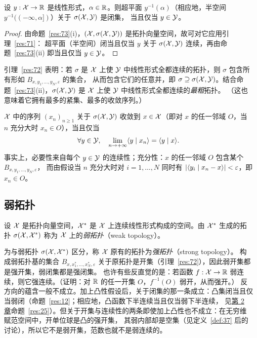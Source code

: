 \begin{corollary}
\label{res:74}
设 $y:\mathcal{X}\to\mathbb{R}$ 是线性形式，$\alpha\in\mathbb{R}$。则超平面 $y^{-1}(\alpha)$（相应地，半空间 $y^{-1}((-\infty,\alpha])$）关于 $\sigma(\mathcal{X},\mathcal{Y})$ 是闭集，
当且仅当 $y\in\mathcal{Y}$。
\end{corollary}

\begin{proof}
由命题~\ref{res:73}(i)，$(\mathcal{X},\sigma(\mathcal{X},\mathcal{Y}))$ 是拓扑向量空间，故可对它应用引理~\ref{res:71}：
超平面（半空间）闭当且仅当 $y$ 关于 $\sigma(\mathcal{X},\mathcal{Y})$ 连续，再由命题~\ref{res:73}(ii) 即当且仅当 $y\in\mathcal{Y}$。
\end{proof}

\begin{remark}[最粗拓扑]
\label{rem:26}
引理~\ref{res:72} 表明：若 $\sigma$ 是 $\mathcal{X}$ 上使 $\mathcal{Y}$ 中线性形式全都连续的拓扑，则 $\sigma$ 包含所有形如 $B_{x,y_1,\dots,y_N,\varepsilon}$ 的集合，
从而包含它们的任意并，即 $\sigma\supseteq\sigma(\mathcal{X},\mathcal{Y})$。结合命题~\ref{res:73}(ii)，$\sigma(\mathcal{X},\mathcal{Y})$ 是 $\mathcal{X}$ 上使 $\mathcal{Y}$ 中线性形式全都连续的\emph{最粗}拓扑。
（这也意味着它拥有最多的紧集、最多的收敛序列。）
\end{remark}

\begin{remark}[序列的收敛]
\label{rem:27}
$\mathcal{X}$ 中的序列 $(x_n)_{n\geqslant1}$ 关于 $\sigma(\mathcal{X},\mathcal{Y})$ 收敛到 $x\in\mathcal{X}$（即对 $x$ 的任一邻域 $O$，当 $n$ 充分大时 $x_n\in O$），当且仅当
\[
  \forall y\in\mathcal{Y},\quad\lim_{n\to+\infty}\langle y \mid x_n\rangle=\langle y \mid x\rangle.
\]
事实上，必要性来自每个 $y\in\mathcal{Y}$ 的连续性；充分性：$x$ 的任一邻域 $O$ 包含某个 $B_{x,y_1,\dots,y_N,\varepsilon}$，
而由假设当 $n$ 充分大时对 $i=1,\dots,N$ 同时有 $\lvert \langle y_i \mid x_n-x\rangle\rvert<\varepsilon$，即 $x_n\in O$。
\end{remark}

\subsection{弱拓扑}

\begin{definition}[弱拓扑]
\label{def:38}
设 $\mathcal{X}$ 是拓扑向量空间，$\mathcal{X}^{*}$ 是 $\mathcal{X}$ 上连续线性形式构成的空间。由 $\mathcal{X}^{*}$ 生成的拓扑 $\sigma(\mathcal{X},\mathcal{X}^{*})$ 称为 $\mathcal{X}$ 上的\emph{弱拓扑}（weak topology）。
\end{definition}

\begin{remark}[与强拓扑的关系]
\label{rem:28}
为与弱拓扑 $\sigma(\mathcal{X},\mathcal{X}^{*})$ 区分，称 $\mathcal{X}$ 原有的拓扑为\emph{强拓扑}（strong topology）。
构成弱拓扑基的集合 $B_{x,x^*_1,\dots,x^*_N,\varepsilon}$ 关于原拓扑是开集（引理~\ref{res:72}），因此弱开集都是强开集，弱闭集都是强闭集。
也许有些反直觉的是：若函数 $f:\mathcal{X}\to\mathbb{R}$ 弱连续，则它强连续。（证明：对 $\mathbb{R}$ 的任一开集 $O$，$f^{-1}(O)$ 弱开，从而强开。）
反方向的蕴含一般不成立。加上凸性假设后，关于闭集的那一条成立：凸集闭当且仅当弱闭（命题~\ref{res:12}；相应地，凸函数下半连续当且仅当弱下半连续，
见\hyperref[ch:ch02]{第 2 章}命题~\ref{res:25}）。但关于开集与连续性的两条即使加上凸性也不成立：在无穷维赋范空间中，开单位球是凸的强开集，
其弱内部却是空集（见定义~\ref{def:37} 后的讨论），所以它不是弱开集，范数也就不是弱连续的。
\end{remark}

